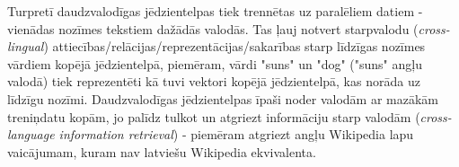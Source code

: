 Turpretī daudzvalodīgas jēdzientelpas tiek trennētas uz paralēliem datiem - vienādas nozīmes tekstiem dažādās valodās. Tas ļauj notvert starpvalodu (\textit{cross-lingual}) attiecības/relācijas/reprezentācijas/sakarības starp līdzīgas nozīmes vārdiem kopējā jēdzientelpā, piemēram, vārdi "suns" un "dog" ("suns" angļu valodā) tiek reprezentēti kā tuvi vektori kopējā jēdzientelpā, kas norāda uz līdzīgu nozīmi. Daudzvalodīgas jēdzientelpas īpaši noder valodām ar mazākām treniņdatu kopām, jo palīdz tulkot un atgriezt informāciju starp valodām (\textit{cross-language information retrieval}) - piemēram atgriezt angļu Wikipedia lapu vaicājumam, kuram nav latviešu Wikipedia ekvivalenta.
